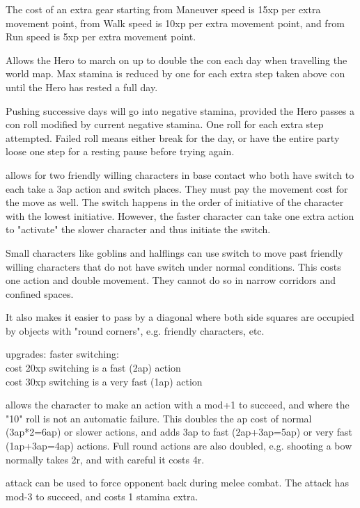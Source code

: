The cost of an extra gear starting from Maneuver speed is 15xp per extra movement point, from Walk speed is 10xp per extra movement point, and from Run speed is 5xp per extra movement point.


Allows the Hero to march on up to double the con each day when travelling the world map. Max stamina is reduced by one for each extra step taken above con until the Hero has rested a full day.

Pushing successive days will go into negative stamina, provided the Hero passes a con roll modified by current negative stamina. One roll for each extra step attempted. Failed roll means either break for the day, or have the entire party loose one step for a resting pause before trying again.


 allows for two friendly willing characters in base contact who both have switch to each take a 3ap action and switch places. They must pay the movement cost for the move as well. The switch happens in the order of initiative of the character with the lowest initiative. However, the faster character can take one extra action to "activate" the slower character and thus initiate the switch.

Small characters like goblins and halflings can use switch to move past friendly willing characters that do not have switch under normal conditions. This costs one action and double movement. They cannot do so in narrow corridors and confined spaces.

It also makes it easier to pass by a diagonal where both side squares are occupied by objects with "round corners", e.g. friendly characters, etc.

upgrades: faster switching: \\
cost 20xp switching is a fast (2ap) action \\
cost 30xp switching is a very fast (1ap) action


 allows the character to make an action with a mod+1 to succeed, and where the "10" roll is not an automatic failure.
This doubles the ap cost of normal (3ap*2=6ap) or slower actions, and adds 3ap to fast (2ap+3ap=5ap) or very fast (1ap+3ap=4ap) actions.
Full round actions are also doubled, e.g. shooting a bow normally takes 2r, and with careful it costs 4r.


 attack can be used to force opponent back during melee combat. The attack has mod-3 to succeed, and costs 1 stamina extra.

